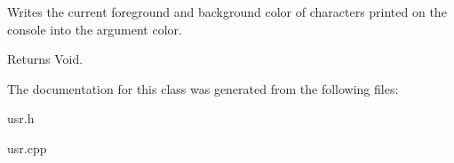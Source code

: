 Writes the current foreground and background color of characters printed on the console into the argument color. 

\begin{DoxyReturn}{Returns}
Void. 
\end{DoxyReturn}


The documentation for this class was generated from the following files\+:\begin{DoxyCompactItemize}
\item 
usr.\+h\item 
usr.\+cpp\end{DoxyCompactItemize}
